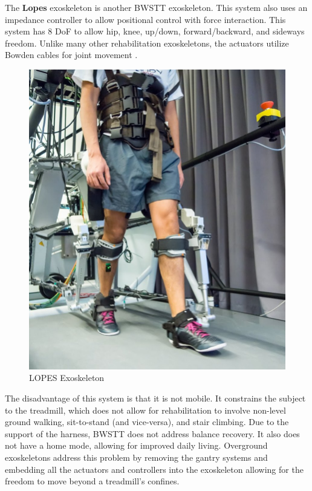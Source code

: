 The \textbf{Lopes} exoskeleton is another BWSTT exoskeleton. This system also uses an impedance controller to allow positional control with force interaction. This system has 8 DoF to allow hip, knee, up/down, forward/backward, and sideways freedom. Unlike many other rehabilitation exoskeletons, the actuators utilize Bowden cables for joint movement \cite{veneman2007design}. 

\begin{figure}[H]
    \centering
    \includegraphics[scale=0.6]{images/background/A-subject-walking-with-LOPES-II-exoskeleton.jpg}
    \caption[LOPES Exoskeleton]{LOPES Exoskeleton \cite{lopes}}
    \label{fig:lopes}
\end{figure}


The disadvantage of this system is that it is not mobile. It constrains the subject to the treadmill, which does not allow for rehabilitation to involve non-level ground walking, sit-to-stand (and vice-versa), and stair climbing. Due to the support of the harness, BWSTT does not address balance recovery. It also does not have a home mode, allowing for improved daily living. Overground exoskeletons address this problem by removing the gantry systems and embedding all the actuators and controllers into the exoskeleton allowing for the freedom to move beyond a treadmill's confines.

